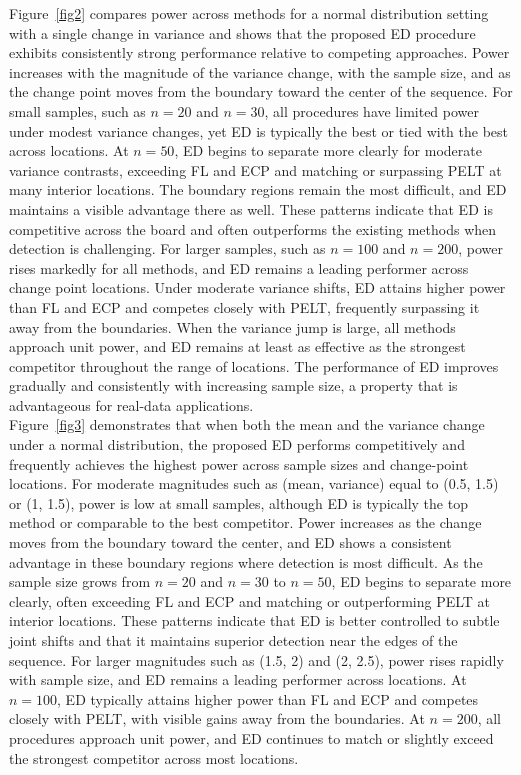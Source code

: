 \documentclass[11pt]{article}
\numberwithin{theorem}{section}
\numberwithin{Lemma}{section}
\numberwithin{Definition}{section}
\begin{document}
Figure~\ref{fig2} compares power across methods for a normal distribution setting with a single change in variance and shows that the proposed ED procedure exhibits consistently strong performance relative to competing approaches. Power increases with the magnitude of the variance change, with the sample size, and as the change point moves from the boundary toward the center of the sequence. For small samples, such as $n=20$ and $n=30$, all procedures have limited power under modest variance changes, yet ED is typically the best or tied with the best across locations. At $n=50$, ED begins to separate more clearly for moderate variance contrasts, exceeding FL and ECP and matching or surpassing PELT at many interior locations. The boundary regions remain the most difficult, and ED maintains a visible advantage there as well. These patterns indicate that ED is competitive across the board and often outperforms the existing methods when detection is challenging. For larger samples, such as $n=100$ and $n=200$, power rises markedly for all methods, and ED remains a leading performer across change point locations. Under moderate variance shifts, ED attains higher power than FL and ECP and competes closely with PELT, frequently surpassing it away from the boundaries. When the variance jump is large, all methods approach unit power, and ED remains at least as effective as the strongest competitor throughout the range of locations. The performance of ED improves gradually and consistently with increasing sample size, a property that is advantageous for real-data applications. \\



Figure~\ref{fig3} demonstrates that when both the mean and the variance change under a normal distribution, the proposed ED performs competitively and frequently achieves the highest power across sample sizes and change-point locations. For moderate magnitudes such as (mean, variance) equal to (0.5, 1.5) or (1, 1.5), power is low at small samples, although ED is typically the top method or comparable to the best competitor. Power increases as the change moves from the boundary toward the center, and ED shows a consistent advantage in these boundary regions where detection is most difficult. As the sample size grows from \(n=20\) and \(n=30\) to \(n=50\), ED begins to separate more clearly, often exceeding FL and ECP and matching or outperforming PELT at interior locations. These patterns indicate that ED is better controlled to subtle joint shifts and that it maintains superior detection near the edges of the sequence.  For larger magnitudes such as (1.5, 2) and (2, 2.5), power rises rapidly with sample size, and ED remains a leading performer across locations. At \(n=100\), ED typically attains higher power than FL and ECP and competes closely with PELT, with visible gains away from the boundaries. At \(n=200\), all procedures approach unit power, and ED continues to match or slightly exceed the strongest competitor across most locations. 
\end{document}
